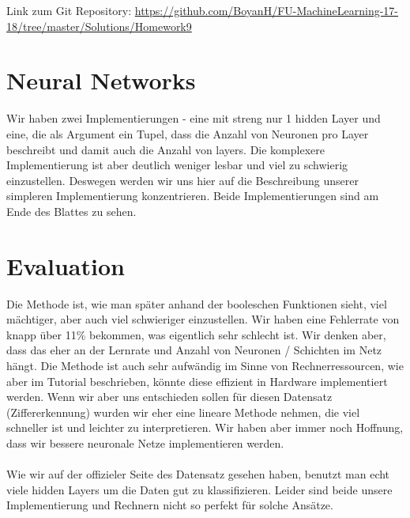 \usepackage{graphicx}
\usepackage{amsmath}
\usepackage{amssymb}
\usepackage{fancyvrb}

\newcommand{\dozent}{Prof. R. Rojas}					%
\newcommand{\projectNo}{9}
\newcommand{\veranstaltung}{Mustererkennung}
\newcommand{\semester}{WS17/18}
\newcommand{\studenten}{Boyan Hristov, Nedeltscho Petrov}





Link zum Git Repository: \url{https://github.com/BoyanH/FU-MachineLearning-17-18/tree/master/Solutions/Homework\projectNo}

\section*{Neural Networks}
Wir haben zwei Implementierungen - eine mit streng nur 1 hidden Layer und eine, die als Argument ein Tupel, dass
die Anzahl von Neuronen pro Layer beschreibt und damit auch die Anzahl von layers. Die komplexere Implementierung
ist aber deutlich weniger lesbar und viel zu schwierig einzustellen.
Deswegen werden wir uns hier auf die Beschreibung unserer simpleren Implementierung konzentrieren. Beide Implementierungen
sind am Ende des Blattes zu sehen.

\section*{Evaluation}
Die Methode ist, wie man später anhand der booleschen Funktionen sieht, viel mächtiger, aber auch viel schwieriger
einzustellen. Wir haben eine Fehlerrate von knapp über 11\% bekommen, was eigentlich sehr schlecht ist. Wir denken aber,
dass das eher an der Lernrate und Anzahl von Neuronen / Schichten im Netz hängt. Die Methode ist auch sehr aufwändig
im Sinne von Rechnerressourcen, wie aber im Tutorial beschrieben, könnte diese effizient in Hardware implementiert
werden. Wenn wir aber uns entschieden sollen für diesen Datensatz (Ziffererkennung) wurden wir eher eine lineare
Methode nehmen, die viel schneller ist und leichter zu interpretieren. Wir haben aber immer noch Hoffnung, dass wir
bessere neuronale Netze implementieren werden. \\ \\

Wie wir auf der offizieler Seite des Datensatz gesehen haben, benutzt man echt viele hidden Layers um die
Daten gut zu klassifizieren. Leider sind beide unsere Implementierung und Rechnern nicht so perfekt für solche
Ansätze.

